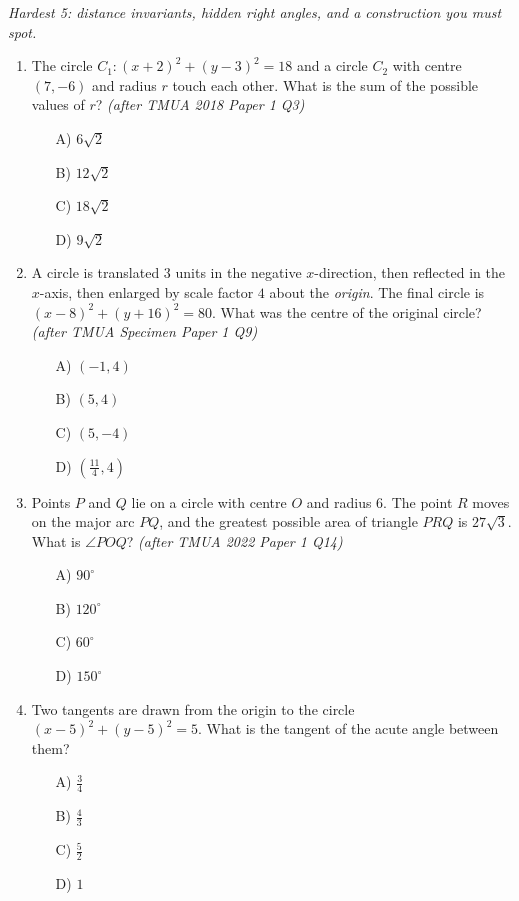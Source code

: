 \documentclass[11pt,a4paper]{article}
\begin{document}
\noindent\textit{Hardest 5: distance invariants, hidden right angles, and a construction you must spot.}

\begin{enumerate}

\item The circle $C_1:(x+2)^2+(y-3)^2=18$ and a circle $C_2$ with centre $(7,-6)$ and radius $r$ touch each other. What is the sum of the possible values of $r$? \textit{\small(after TMUA 2018 Paper 1 Q3)}
\begin{itemize}
\item[A)] $6\sqrt2$
\item[B)] $12\sqrt2$
\item[C)] $18\sqrt2$
\item[D)] $9\sqrt2$
\end{itemize}

\item A circle is translated $3$ units in the negative $x$-direction, then reflected in the $x$-axis, then enlarged by scale factor $4$ about the \emph{origin}. The final circle is $(x-8)^2+(y+16)^2=80$. What was the centre of the original circle? \textit{\small(after TMUA Specimen Paper 1 Q9)}
\begin{itemize}
\item[A)] $(-1,4)$
\item[B)] $(5,4)$
\item[C)] $(5,-4)$
\item[D)] $(\tfrac{11}{4},4)$
\end{itemize}

\item Points $P$ and $Q$ lie on a circle with centre $O$ and radius $6$. The point $R$ moves on the major arc $PQ$, and the greatest possible area of triangle $PRQ$ is $27\sqrt3$. What is $\angle POQ$? \textit{\small(after TMUA 2022 Paper 1 Q14)}
\begin{itemize}
\item[A)] $90^\circ$
\item[B)] $120^\circ$
\item[C)] $60^\circ$
\item[D)] $150^\circ$
\end{itemize}

\item Two tangents are drawn from the origin to the circle $(x-5)^2+(y-5)^2=5$. What is the tangent of the acute angle between them?
\begin{itemize}
\item[A)] $\tfrac34$
\item[B)] $\tfrac43$
\item[C)] $\tfrac52$
\item[D)] $1$
\end{itemize}


\end{enumerate}
\end{document}

